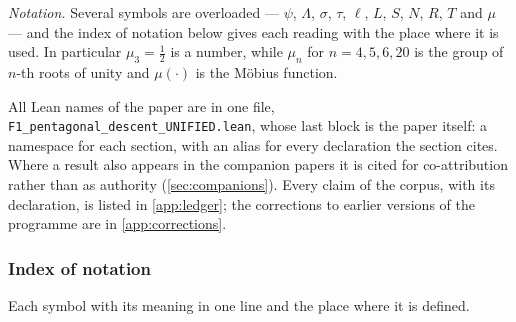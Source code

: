 \emph{Notation.}  Several symbols are overloaded --- $\psi$, $\Lambda$, $\sigma$, $\tau$, $\ell$, $L$, $S$, $N$, $R$, $T$ and $\mu$ ---
and the index of notation below gives each reading with the place where it is used.  In particular
$\mu_3=\tfrac12$ is a number, while $\mu_n$ for $n=4,5,6,20$ is the group of $n$-th roots of unity and
$\mu(\cdot)$ is the M\"obius function.

All Lean names of the paper are in one file,
\texttt{F1\_pentagonal\_descent\_UNIFIED.lean}, whose last block is the paper itself: a
namespace for each section, with an alias for every declaration the section cites.
Where a result also appears in the companion papers it is cited for
co-attribution rather than as authority (\cref{sec:companions}).  Every claim of
the corpus, with its declaration, is listed in \cref{app:ledger};
the corrections to earlier versions of the programme are in
\cref{app:corrections}.

\subsubsection{Index of notation}\label{app:notation}
Each symbol with its meaning in one line and the place where it is defined.

